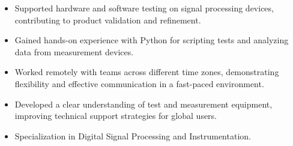 \par\smallskip
\noindent
\begin{minipage}{20cm}
  \begin{minipage}{9.75cm}
    \begin{itemize}
      \item Supported hardware and software testing on signal processing devices, contributing to product validation and refinement.
      \item Gained hands-on experience with Python for scripting tests and analyzing data from measurement devices.
    \end{itemize}
  \end{minipage}
  \hfill
  \begin{minipage}{9.75cm}
    \begin{itemize}
      \item Worked remotely with teams across different time zones, demonstrating flexibility and effective communication in a fast-paced environment.
      \item Developed a clear understanding of test and measurement equipment, improving technical support strategies for global users.
    \end{itemize}
  \end{minipage}
\end{minipage}

\begin{itemize}
  \item Specialization in Digital Signal Processing and Instrumentation.
\end{itemize}

\noindent
\begin{minipage}{20cm}
\end{minipage}


